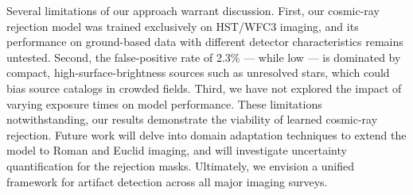 Several limitations of our approach warrant discussion. First, our cosmic-ray rejection model was trained exclusively on HST/WFC3 imaging, and its performance on ground-based data with different detector characteristics remains untested. Second, the false-positive rate of 2.3\% — while low — is dominated by compact, high-surface-brightness sources such as unresolved stars, which could bias source catalogs in crowded fields. Third, we have not explored the impact of varying exposure times on model performance. These limitations notwithstanding, our results demonstrate the viability of learned cosmic-ray rejection. Future work will delve into domain adaptation techniques to extend the model to Roman and Euclid imaging, and will investigate uncertainty quantification for the rejection masks. Ultimately, we envision a unified framework for artifact detection across all major imaging surveys.
